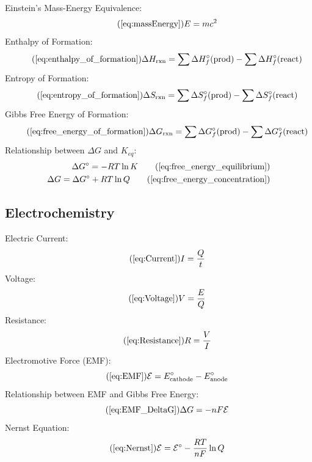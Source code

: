        Einstein's Mass-Energy Equivalence:
        \begin{equation}\tag{\ref{eq:massEnergy}}
            E = mc^2
        \end{equation}
        Enthalpy of Formation:
        \begin{equation}\tag{\ref{eq:enthalpy_of_formation}}
            \Delta H_\text{rxn} = \sum \Delta H_f^\circ(\text{prod}) - \sum \Delta H_f^\circ (\text{react})
        \end{equation}
        Entropy of Formation:
        \begin{equation}\tag{\ref{eq:entropy_of_formation}}
            \Delta S_\text{rxn} = \sum \Delta S_f^\circ(\text{prod}) - \sum \Delta S_f^\circ (\text{react})
        \end{equation}
        Gibbs Free Energy of Formation:
        \begin{equation}\tag{\ref{eq:free_energy_of_formation}}
            \Delta G_\text{rxn} = \sum \Delta G_f^\circ(\text{prod}) - \sum \Delta G_f^\circ (\text{react})
        \end{equation}
        Relationship between $\Delta G$ and $K_{eq}$:
        \begin{align}
            \Delta G^\circ = -RT \ln{K} \tag{\ref{eq:free_energy_equilibrium}} \\
            \Delta G = \Delta G^\circ + RT \ln{Q} \tag{\ref{eq:free_energy_concentration}}
        \end{align}
    \subsection{Electrochemistry}
        Electric Current:
        \begin{equation}\tag{\ref{eq:Current}}
            I = \frac{Q}{t}
        \end{equation}
        Voltage:
        \begin{equation}\tag{\ref{eq:Voltage}}
            V = \frac{E}{Q}
        \end{equation}
        Resistance:
        \begin{equation}\tag{\ref{eq:Resistance}}
            R = \frac{V}{I}
        \end{equation}
        Electromotive Force (EMF):
        \begin{equation}\tag{\ref{eq:EMF}}
            \mathcal{E} = E^\circ_{\text{cathode}} - E^\circ_{\text{anode}}
        \end{equation}
        Relationship between EMF and Gibbs Free Energy:
        \begin{equation}\tag{\ref{eq:EMF_DeltaG}}
            \Delta G = -nF\mathcal{E}
        \end{equation}
        Nernst Equation:
        \begin{equation}\tag{\ref{eq:Nernst}}
            \mathcal{E} = \mathcal{E}^\circ - \frac{RT}{nF} \ln Q
        \end{equation}
